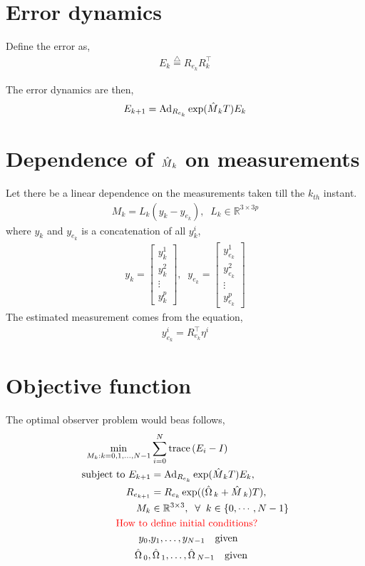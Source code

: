 \documentclass[12pt]{article}
\def\deff{\stackrel{\triangle}{=}}
\begin{document}
\section{Error dynamics}
Define the error as,
\begin{align}
    E_k \deff R_{e_k} R_{k}^\top
\end{align}

The error dynamics are then,
\begin{align}
    E_{k+1} = \operatorname{Ad}_{R_{e_k}}   {\exp({\mathop{\hat{M}}}_{k} T) }  E_k
\end{align}

\section{Dependence of $\mathop{\hat{M}}_{k}$ on measurements}
Let there be a linear dependence on the measurements taken till the $k_{th}$ instant.
\begin{align}
    M_{k} = L_k(y_k - y_{e_k}), \;\; L_k \in \mathbb{R}^{3 \times 3p}
\end{align}
where $y_k$ and $y_{e_k}$ is a concatenation of all $y_k^i$,
\begin{align}
    y_k = \begin{bmatrix}
    y_k^1 \\
    y_k^2 \\
    \vdots \\
    y_k^p
    \end{bmatrix}, \;\; y_{e_k} = \begin{bmatrix}
    y_{e_k}^1 \\
    y_{e_k}^2 \\
    \vdots \\
    y_{e_k}^p
    \end{bmatrix}
\end{align}
The estimated measurement comes from the equation,
\begin{align}
    y_{e_k}^i = R_{e_k}^\top \eta^i
\end{align}

\section{Objective function}

The optimal observer problem would beas follows,
\begin{align*}
    \min_{M_k: k=0, 1, \ldots, N - 1} &\sum_{i=0}^{N} \mathop{\hbox{trace}}{(E_i - I)}
	\nonumber \\
	\hbox{subject to } E_{k+1} &= \operatorname{Ad}_{R_{e_k}}   {\exp({\mathop{\hat{M}}}_{k} T) }  E_k,
	\nonumber \\ 
	R_{e_{k+1}} &= R_{e_k} \exp (( \mathop{\hat{\Omega}}{} _k + \mathop{\hat{M}}{}_k)T),
	\nonumber \\
	M_k & \in \mathbb{R}^{3\times3}, \;\; \forall \;\; k \in \{0, \cdots, N-1\}\\
	\hbox{\color{red}{How to }} & \hbox{\color{red}{define initial conditions?}}\\
	y_0, & y_1, \ldots, y_{N-1} \quad \hbox{given}
	\nonumber \\
	\mathop{\hat{\Omega}}{}_0, & \mathop{\hat{\Omega}}{}_1, \ldots, \mathop{\hat{\Omega}}{}_{N-1} \quad \hbox{given}
\end{align*}
\end{document}
